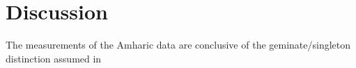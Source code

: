 \documentclass[12pt]{article}
\begin{document}







\section{Discussion}

The measurements of the Amharic data are conclusive of the geminate/singleton distinction assumed in 
\end{document}
